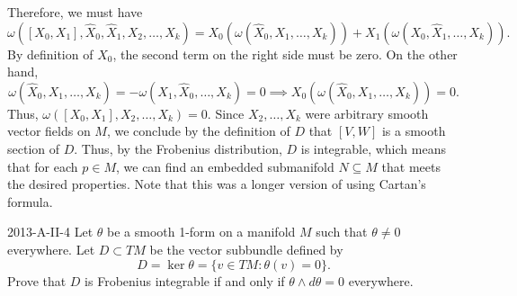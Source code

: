 \documentclass{article}
\begin{document}
	Therefore, we must have 
	\begin{equation*}
		\omega([X_{0}, X_{1}], \hat{X}_{0}, \hat{X}_{1}, X_{2}, \ldots, X_{k}) = X_{0}(\omega(\hat{X}_{0}, X_{1}, \ldots, X_{k})) + X_{1}(\omega(X_{0}, \hat{X}_{1}, \ldots, X_{k})). 
	\end{equation*}
	By definition of $X_{0}$, the second term on the right side must be zero. On the other hand, 
	\begin{equation*}
		\omega(\hat{X}_{0}, X_{1}, \ldots, X_{k}) = -\omega(X_{1}, \hat{X}_{0}, \ldots, X_{k}) = 0 \implies X_{0}(\omega(\hat{X}_{0}, X_{1}, \ldots, X_{k})) = 0. 
	\end{equation*}
	Thus, $\omega([X_{0}, X_{1}], X_{2}, \ldots, X_{k}) = 0$. Since $X_{2}, \ldots, X_{k}$ were arbitrary smooth vector fields on $M$, we conclude by the definition of $D$ that $[V, W]$ is a smooth section of $D$. Thus, by the Frobenius distribution, $D$ is integrable, which means that for each $p \in M$, we can find an embedded submanifold $N \subseteq M$ that meets the desired properties. Note that this was a longer version of using Cartan's formula. 
	
	\begin{prb}{2013-A-II-4}
		Let $\theta$ be a smooth 1-form on a manifold $M$ such that $\theta \neq 0$ everywhere. Let $D \subset TM$ be the vector subbundle defined by 
		\begin{equation*}
			D = \ker{\theta} = \{v \in TM: \theta(v) = 0\}. 
		\end{equation*}
		Prove that $D$ is Frobenius integrable if and only if $\theta \wedge d\theta = 0$ everywhere. 
	\end{prb}
	
\end{document}
